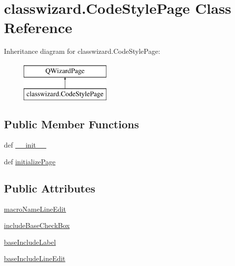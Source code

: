 \hypertarget{classclasswizard_1_1CodeStylePage}{}\section{classwizard.\+Code\+Style\+Page Class Reference}
\label{classclasswizard_1_1CodeStylePage}
Inheritance diagram for classwizard.\+Code\+Style\+Page\+:\begin{figure}[H]
\begin{center}
\leavevmode
\includegraphics[height=2.000000cm]{classclasswizard_1_1CodeStylePage}
\end{center}
\end{figure}
\subsection*{Public Member Functions}
\begin{DoxyCompactItemize}
\item 
def \hyperlink{classclasswizard_1_1CodeStylePage_af7642b74fa849585660d34a61cbf3e2c}{\+\_\+\+\_\+init\+\_\+\+\_\+}
\item 
def \hyperlink{classclasswizard_1_1CodeStylePage_a750a6713e90a7bcf08719c57dc262d97}{initialize\+Page}
\end{DoxyCompactItemize}
\subsection*{Public Attributes}
\begin{DoxyCompactItemize}
\item 
\hyperlink{classclasswizard_1_1CodeStylePage_ab6fe7d37422f592443b8a6de107f215c}{macro\+Name\+Line\+Edit}
\item 
\hyperlink{classclasswizard_1_1CodeStylePage_a3869af36d9a8015725c42f47304f0d04}{include\+Base\+Check\+Box}
\item 
\hyperlink{classclasswizard_1_1CodeStylePage_a53976ecb4b8024455d529eac10ca0374}{base\+Include\+Label}
\item 
\hyperlink{classclasswizard_1_1CodeStylePage_a0b1da319d1ae5a4f73f985e6db133ebe}{base\+Include\+Line\+Edit}
\end{DoxyCompactItemize}


